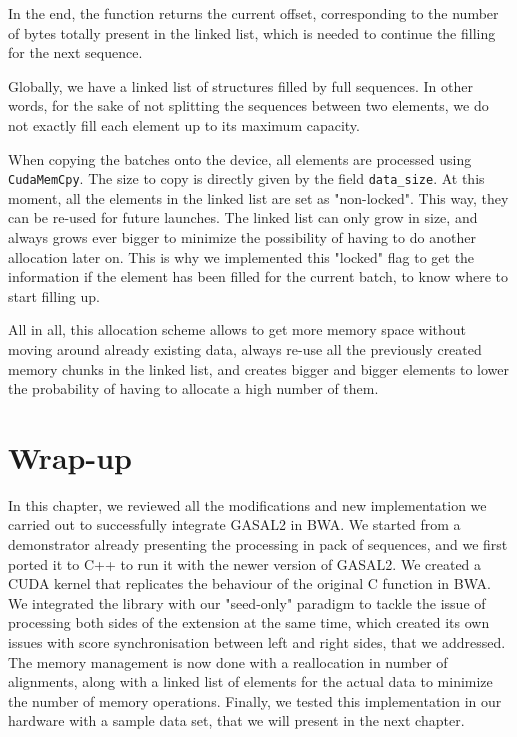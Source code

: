 In the end, the function returns the current offset, corresponding to the number of bytes totally present in the linked list, which is needed to continue the filling for the next sequence.

Globally, we have a linked list of structures filled by full sequences. In other words, for the sake of not splitting the sequences between two elements, we do not exactly fill each element up to its maximum capacity. 

When copying the batches onto the device, all elements are processed using \verb|CudaMemCpy|. The size to copy is directly given by the field \verb|data_size|. At this moment, all the elements in the linked list are set as "non-locked". This way, they can be re-used for future launches. The linked list can only grow in size, and always grows ever bigger to minimize the possibility of having to do another allocation later on. This is why we implemented this "locked" flag to get the information if the element has been filled for the current batch, to know where to start filling up.

All in all, this allocation scheme allows to get more memory space without moving around already existing data, always re-use all the previously created memory chunks in the linked list, and creates bigger and bigger elements to lower the probability of having to allocate a high number of them.

\section*{Wrap-up}
In this chapter, we reviewed all the modifications and new implementation we carried out to successfully integrate GASAL2 in BWA. We started from a demonstrator already presenting the processing in pack of sequences, and we first ported it to C++ to run it with the newer version of GASAL2. We created a CUDA kernel that replicates the behaviour of the original C function in BWA. We integrated the library with our "seed-only" paradigm to tackle the issue of processing both sides of the extension at the same time, which created its own issues with score synchronisation between left and right sides, that we addressed. The memory management is now done with a reallocation in number of alignments, along with a linked list of elements for the actual data to minimize the number of memory operations. Finally, we tested this implementation in our hardware with a sample data set, that we will present in the next chapter.


